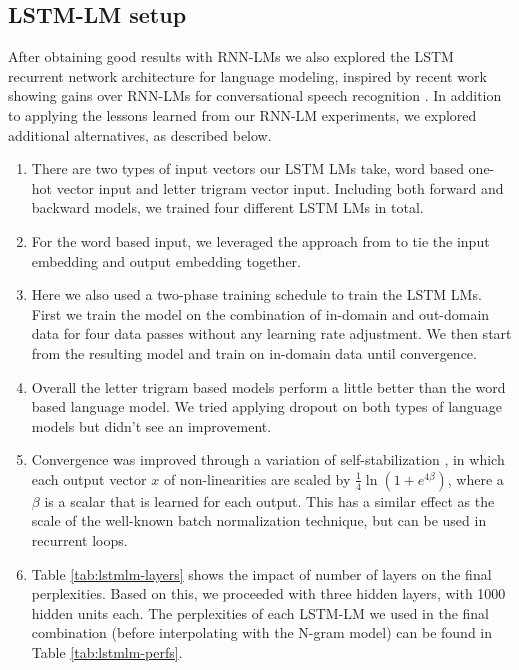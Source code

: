 \documentclass{article}
\begin{document}
\subsection{LSTM-LM setup}
After obtaining good results with RNN-LMs we also explored the LSTM recurrent network architecture for
language modeling, inspired by recent work showing gains over RNN-LMs for conversational speech recognition
\cite{medennikov2016improving}.
In addition to applying the lessons learned from our RNN-LM experiments, we explored additional alternatives,
as described below.
\begin{enumerate}
\item
	There are two types of input vectors our LSTM LMs take, word based one-hot vector input and letter trigram vector \cite{huang2013learning} input.
	Including both forward and backward models, we trained four different LSTM LMs in total. 
\item
	For the word based input, we leveraged the approach from \cite{press2016using} to tie the input embedding and output embedding together. 
\item
	Here we also used a two-phase training schedule to train the LSTM LMs. First we train the model on the combination of in-domain 
	and out-domain data for four data passes without any learning rate adjustment. We then start from the resulting model 
	and train on in-domain data until convergence. 
\item
	Overall the letter trigram based models perform a little better than the word based language model. We tried applying dropout on both types of language
	models but didn't see an improvement.
\item
	Convergence was improved through a variation of self-stabilization \cite{ghahremani2016stab}, in which each output vector $x$ of non-linearities are scaled by
	$\frac{1}{4}\ln(1 + e^{4\beta})$, where a $\beta$ is a scalar that is learned for each output.
	This has a similar effect as the scale of the well-known batch normalization technique, but can be used in recurrent loops.
\item
	Table \ref{tab:lstmlm-layers} shows the impact of number of layers on the final perplexities.
	Based on this, we proceeded with three hidden layers, with 1000 hidden units each.
	The perplexities of each LSTM-LM we used in the final combination (before interpolating with the N-gram model)
	can be found in Table \ref{tab:lstmlm-perfs}.
\end{enumerate}
\end{document}
